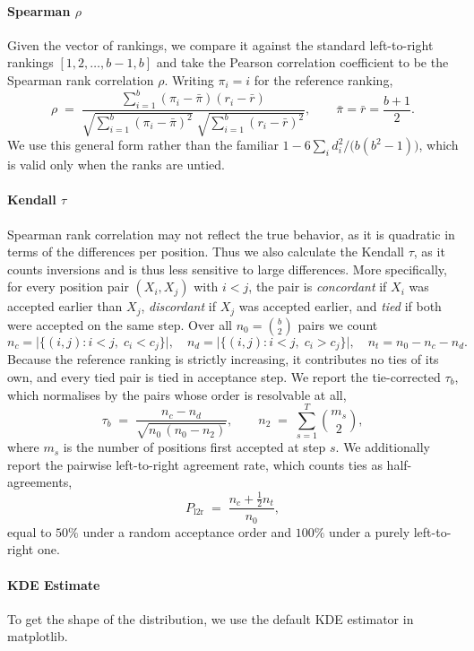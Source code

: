 \paragraph{Spearman $\rho$}
Given the vector of rankings, we compare it against the standard
left-to-right rankings $[1, 2, \dots, b-1, b]$ and take the Pearson
correlation coefficient to be the Spearman rank correlation $\rho$. Writing
$\pi_i = i$ for the reference ranking,
\begin{equation}
  \rho \;=\;
  \frac{\sum_{i=1}^{b} (\pi_i - \bar{\pi})(r_i - \bar{r})}
       {\sqrt{\sum_{i=1}^{b} (\pi_i - \bar{\pi})^{2}}\;
        \sqrt{\sum_{i=1}^{b} (r_i - \bar{r})^{2}}},
  \qquad \bar{\pi} = \bar{r} = \frac{b+1}{2}.
\end{equation}
We use this general form rather than the familiar
$1 - 6\sum_i d_i^{2}/\bigl(b(b^{2}-1)\bigr)$, which is valid only when the
ranks are untied.

\paragraph{Kendall $\tau$}
Spearman rank correlation may not reflect the true behavior, as it is
quadratic in terms of the differences per position. Thus we also calculate
the Kendall $\tau$, as it counts inversions and is thus less sensitive to
large differences. More specifically, for every position pair $(X_i, X_j)$
with $i < j$, the pair is \emph{concordant} if $X_i$ was accepted earlier
than $X_j$, \emph{discordant} if $X_j$ was accepted earlier, and
\emph{tied} if both were accepted on the same step. Over all
$n_0 = \binom{b}{2}$ pairs we count
\begin{equation}
  n_c = \bigl|\{(i,j) : i<j,\; c_i < c_j\}\bigr|, \quad
  n_d = \bigl|\{(i,j) : i<j,\; c_i > c_j\}\bigr|, \quad
  n_t = n_0 - n_c - n_d .
\end{equation}
Because the reference ranking is strictly increasing, it contributes no
ties of its own, and every tied pair is tied in acceptance step. We report the
tie-corrected $\tau_b$, which normalises by the pairs whose order is
resolvable at all,
\begin{equation}
  \tau_b \;=\; \frac{n_c - n_d}{\sqrt{n_0\,(n_0 - n_2)}},
  \qquad
  n_2 \;=\; \sum_{s=1}^{T} \binom{m_s}{2},
\end{equation}
where $m_s$ is the number of positions first accepted at step $s$. We
additionally report the pairwise left-to-right agreement rate, which counts
ties as half-agreements,
\begin{equation}
  P_{\mathrm{l2r}} \;=\; \frac{n_c + \tfrac{1}{2} n_t}{n_0},
\end{equation}
equal to $50\%$ under a random acceptance order and $100\%$ under a purely
left-to-right one.

\paragraph{KDE Estimate}
To get the shape of the distribution, we use the default KDE estimator in matplotlib. 

